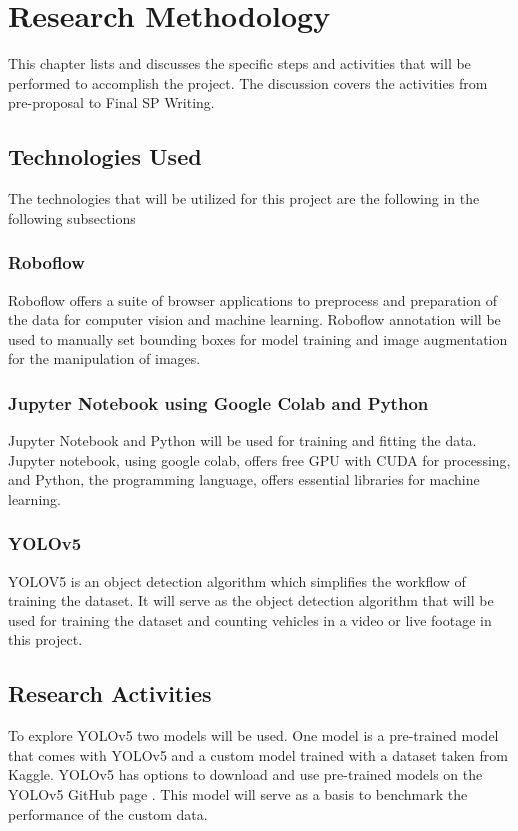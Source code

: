 \chapter{Research Methodology}
This chapter lists and discusses the specific steps and activities that will be performed  to accomplish the project. 
The discussion covers the activities from pre-proposal to Final SP Writing.

\section{Technologies Used}
The technologies that will be utilized for this project are the following in the following subsections

\subsection{Roboflow}
Roboflow offers a suite  of browser applications to preprocess and preparation of the data for computer vision and machine learning. Roboflow annotation will be used  to manually set bounding boxes for model training and image augmentation for the manipulation of images. \cite{roboflow}

\subsection{Jupyter Notebook using Google Colab and Python}
Jupyter Notebook and Python will be used for training and fitting the data. Jupyter notebook, using google colab,  offers free GPU with CUDA for processing, and Python, the programming language, offers essential libraries for machine learning. \cite{googlecolab}

\subsection{YOLOv5}
 YOLOV5 is an object detection algorithm which simplifies the workflow of training the dataset. It will serve as the object detection algorithm that will be used for training the dataset and counting vehicles in a video or live footage in this project.

\section{Research Activities}
To explore YOLOv5 two models will be used. One model is a pre-trained model that comes with YOLOv5 and a custom model trained with a dataset taken from Kaggle. YOLOv5 has options to download and use pre-trained models on the YOLOv5 GitHub page \cite{ultralytics}. This model will serve as a basis to benchmark the performance of the custom data.

